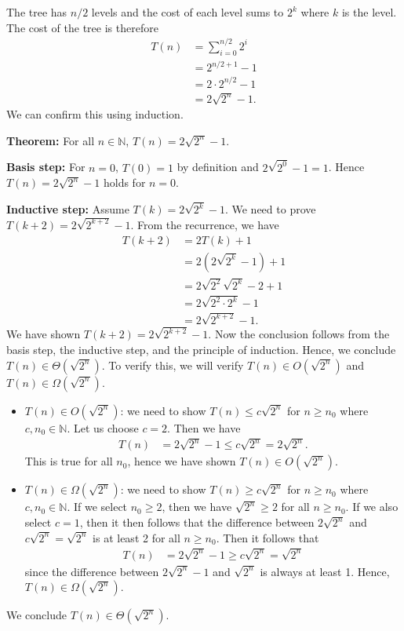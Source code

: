 \documentclass[11pt, letterpaper, titlepage]{article}
\begin{document}
\begin{enumerate}[label=\alph*)]
    The tree has $n / 2$ levels and the cost of each level sums to $2^k$ where $k$ is the level. The cost of the tree is therefore 
    \begin{align}
        T(n) &= \sum_{i = 0}^{n / 2} 2^i \\
        &= 2^{n / 2 + 1} - 1 \\
        &= 2 \cdot 2^{n / 2} - 1 \\
        &= 2 \sqrt{2^n} - 1.
    \end{align}
    We can confirm this using induction.

    \textbf{Theorem:} For all $n \in \mathbb{N}$, $T(n) = 2 \sqrt{2^n} - 1$.

    \textbf{Basis step:} For $n = 0$, $T(0) = 1$ by definition and $2\sqrt{2^0} - 1 = 1$. Hence $T(n) = 2 \sqrt{2^n} - 1$ holds for $n = 0$.

    \textbf{Inductive step:} Assume $T(k) = 2\sqrt{2^k} - 1$. We need to prove $T(k + 2) = 2\sqrt{2^{k + 2}} - 1$. From the recurrence, we have 
    \begin{align}
        T(k + 2) &= 2T(k) + 1 \\
        &= 2(2\sqrt{2^k} - 1) + 1 \\
        &= 2\sqrt{2^2}\sqrt{2^k} - 2 + 1 \\
        &= 2\sqrt{2^2 \cdot 2^k} - 1 \\
        &= 2\sqrt{2^{k + 2}} - 1.
    \end{align}
    We have shown $T(k+2) = 2\sqrt{2^{k + 2}} - 1$. Now the conclusion follows from the basis step, the inductive step, and the principle of induction. Hence, we conclude $T(n) \in \Theta(\sqrt{2^n})$. To verify this, we will verify $T(n) \in O(\sqrt{2^n})$ and $T(n) \in \Omega(\sqrt{2^n})$.
    \begin{itemize}
        \item $T(n) \in O(\sqrt{2^n})$: we need to show $T(n) \leq c\sqrt{2^n}$ for $n \geq n_0$ where $c, n_0 \in \mathbb{N}$. Let us choose $c = 2$. Then we have 
        \begin{align}
            T(n) &= 2 \sqrt{2^n} - 1
            \leq c \sqrt{2^n}
            = 2\sqrt{2^n}.
        \end{align}
        This is true for all $n_0$, hence we have shown $T(n) \in O(\sqrt{2^n})$.

        \item $T(n) \in \Omega(\sqrt{2^n})$: we need to show $T(n) \geq c\sqrt{2^n}$ for $n \geq n_0$ where $c, n_0 \in \mathbb{N}$. If we select $n_0 \geq 2$, then we have $\sqrt{2^n} \geq 2$ for all $n \geq n_0$. If we also select $c = 1$, then it then follows that the difference between $2\sqrt{2^n}$ and $c\sqrt{2^n} = \sqrt{2^n}$ is at least 2 for all $n \geq n_0$. Then it follows that 
        \begin{align}
            T(n) &= 2\sqrt{2^n} - 1 \geq c\sqrt{2^n} = \sqrt{2^n}
        \end{align}
        since the difference between $2\sqrt{2^n} - 1$ and $\sqrt{2^n}$ is always at least 1. Hence, $T(n) \in \Omega(\sqrt{2^n})$.
    \end{itemize}
    We conclude $T(n) \in \Theta(\sqrt{2^n})$.
\end{enumerate}
\end{document}
